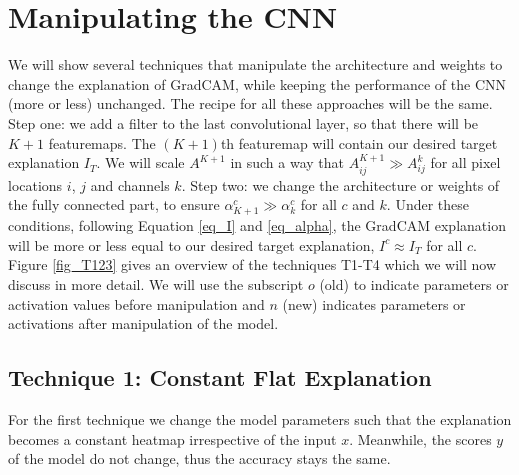 \documentclass{article}
\begin{document}
\section{Manipulating the CNN}

We will show several techniques that manipulate the architecture and weights to change the explanation of GradCAM, while keeping the performance of the CNN (more or less) unchanged. The recipe for all these approaches will be the same. Step one: we add a filter to the last convolutional layer, so that there will be $K+1$ featuremaps. The $(K+1)$th featuremap will contain our desired target explanation $I_T$. We will scale $A^{K+1}$ in such a way that $A^{K+1}_{ij} \gg A^k_{ij}$ for all pixel locations $i$, $j$ and channels $k$.
Step two: we change the architecture or weights of the fully connected part, to ensure $\alpha_{K+1}^c \gg \alpha_k^c$ for all $c$ and $k$. Under these conditions, following Equation \ref{eq_I} and \ref{eq_alpha}, the GradCAM explanation will be more or less equal to our desired target explanation, $I^c \approx I_T$ for all $c$. Figure \ref{fig_T123} gives an overview of the techniques T1-T4 which we will now discuss in more detail. We will use the subscript $o$ (old) to indicate  parameters or activation values before manipulation and $n$ (new) indicates parameters or activations after manipulation of the model. 

\subsection{Technique 1: Constant Flat Explanation}

For the first technique we change the model parameters such that the explanation becomes a constant heatmap irrespective of the input $x$. Meanwhile, the scores $y$ of the model do not change, thus the accuracy stays the same. 
\end{document}
